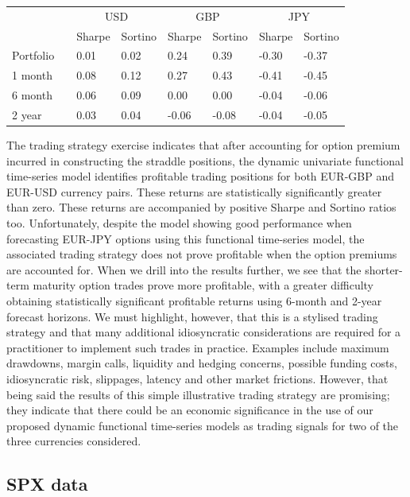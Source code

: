 \documentclass[12pt,a4paper]{article}
\begin{document}
\begin{table}[!htbp]
\begin{tabular}{@{}llllllll@{}}
          &  & \multicolumn{2}{c}{USD} & \multicolumn{2}{c}{GBP} & \multicolumn{2}{c}{JPY} \\
          &  & Sharpe     & Sortino    & Sharpe     & Sortino    & Sharpe     & Sortino    \\ \midrule
Portfolio &  & 0.01       & 0.02       & 0.24       & 0.39       & -0.30      & -0.37      \\
1 month   &  & 0.08       & 0.12       & 0.27       & 0.43       & -0.41      & -0.45      \\
6 month   &  & 0.06       & 0.09       & 0.00       & 0.00       & -0.04      & -0.06      \\
2 year    &  & 0.03       & 0.04       & -0.06      & -0.08      & -0.04      & -0.05      \\
\bottomrule
\end{tabular}
\end{table}

The trading strategy exercise indicates that after accounting for option premium incurred in constructing the straddle positions, the dynamic univariate functional time-series model identifies profitable trading positions for both EUR-GBP and EUR-USD currency pairs. These returns are statistically significantly greater than zero. These returns are accompanied by positive Sharpe and Sortino ratios too. Unfortunately, despite the model showing good performance when forecasting EUR-JPY options using this functional time-series model, the associated trading strategy does not prove profitable when the option premiums are accounted for. When we drill into the results further, we see that the shorter-term maturity option trades prove more profitable, with a greater difficulty obtaining statistically significant profitable returns using 6-month and 2-year forecast horizons. We must highlight, however, that this is a stylised trading strategy and that many additional idiosyncratic considerations are required for a practitioner to implement such trades in practice. Examples include maximum drawdowns, margin calls, liquidity and hedging concerns, possible funding costs, idiosyncratic risk, slippages, latency and other market frictions. However, that being said the results of this simple illustrative trading strategy are promising; they indicate that there could be an economic significance in the use of our proposed dynamic functional time-series models as trading signals for two of the three currencies considered.

\subsection{SPX data}
\end{document}
